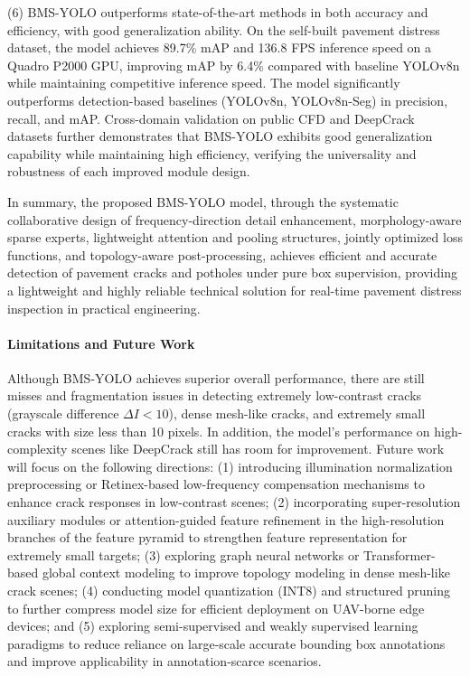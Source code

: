 \documentclass[twocolumn]{sn-jnl}
\begin{document}
	(6) BMS-YOLO outperforms state-of-the-art methods in both accuracy and efficiency, with good generalization ability. On the self-built pavement distress dataset, the model achieves 89.7\% mAP and 136.8 FPS inference speed on a Quadro P2000 GPU, improving mAP by 6.4\% compared with baseline YOLOv8n while maintaining competitive inference speed. The model significantly outperforms detection-based baselines (YOLOv8n, YOLOv8n-Seg) in precision, recall, and mAP. Cross-domain validation on public CFD and DeepCrack datasets further demonstrates that BMS-YOLO exhibits good generalization capability while maintaining high efficiency, verifying the universality and robustness of each improved module design.
	
	In summary, the proposed BMS-YOLO model, through the systematic collaborative design of frequency-direction detail enhancement, morphology-aware sparse experts, lightweight attention and pooling structures, jointly optimized loss functions, and topology-aware post-processing, achieves efficient and accurate detection of pavement cracks and potholes under pure box supervision, providing a lightweight and highly reliable technical solution for real-time pavement distress inspection in practical engineering.
	
	\paragraph{Limitations and Future Work}
	Although BMS-YOLO achieves superior overall performance, there are still misses and fragmentation issues in detecting extremely low-contrast cracks (grayscale difference $\Delta I < 10$), dense mesh-like cracks, and extremely small cracks with size less than 10 pixels. In addition, the model's performance on high-complexity scenes like DeepCrack still has room for improvement. Future work will focus on the following directions: (1) introducing illumination normalization preprocessing or Retinex-based low-frequency compensation mechanisms to enhance crack responses in low-contrast scenes; (2) incorporating super-resolution auxiliary modules or attention-guided feature refinement in the high-resolution branches of the feature pyramid to strengthen feature representation for extremely small targets; (3) exploring graph neural networks or Transformer-based global context modeling to improve topology modeling in dense mesh-like crack scenes; (4) conducting model quantization (INT8) and structured pruning to further compress model size for efficient deployment on UAV-borne edge devices; and (5) exploring semi-supervised and weakly supervised learning paradigms to reduce reliance on large-scale accurate bounding box annotations and improve applicability in annotation-scarce scenarios.
\end{document}
